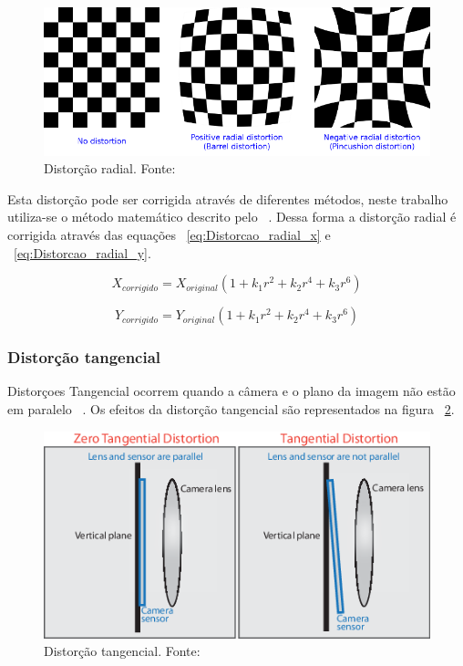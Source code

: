 \begin{figure}[h]
	\centering
	\includegraphics[width=.7\columnwidth]{images/Distorcao_radial.png}
	\caption{Distorção radial. Fonte: ~\cite[]{ozcakir_2020}}
	\label{fig:Distorcao_radial}
\end{figure}

Esta distorção pode ser corrigida através de diferentes métodos, neste trabalho utiliza-se o método matemático descrito pelo ~\cite[]{opencv_library}.
Dessa forma a distorção radial é corrigida através das equações ~\ref{eq:Distorcao_radial_x} e ~\ref{eq:Distorcao_radial_y}.

\begin{equation}
	X_{corrigido} = X_{original} (1 + k_1 r^2 + k_2 r^4 + k_3 r^6)
	\label{eq:Distorcao_radial_x}
\end{equation}

\begin{equation}
	Y_{corrigido} = Y_{original} (1 + k_1 r^2 + k_2 r^4 + k_3 r^6)
	\label{eq:Distorcao_radial_y}
\end{equation}

\subsubsection{Distorção tangencial}
Distorçoes Tangencial ocorrem quando a câmera e o plano da imagem não estão em paralelo ~\cite[]{ozcakir_2020}.
Os efeitos da distorção tangencial são representados na figura ~\ref{fig:Distorcao_tangencial}.

\begin{figure}[h]
	\centering
	\includegraphics[width=.7\columnwidth]{images/Distorcao_tangencial.png}
	\caption{Distorção tangencial. Fonte: ~\cite[]{ozcakir_2020}}
	\label{fig:Distorcao_tangencial}
\end{figure}

